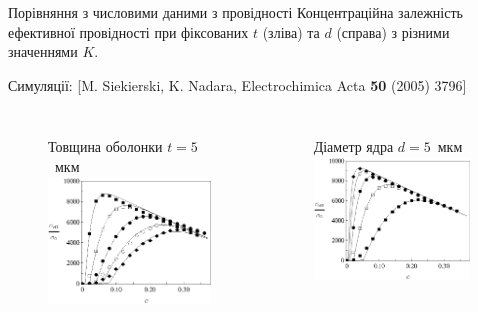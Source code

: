 \documentclass[10pt]{beamer}
\begin{document}
\begin{frame}{Порівняння з числовими даними з провідності}
Концентраційна залежність ефективної провідності при фіксованих $t$ (зліва) та $d$ (справа) з різними значеннями $K$.
\vspace{-5pt}

\scriptsize{Симуляції: [M. Siekierski, K. Nadara, Electrochimica Acta {\bf 50} (2005) 3796]}

\footnotesize
\begin{columns}[T,onlytextwidth]
      \begin{figure}
        \centering
        { \qquad Товщина оболонки $t=5$~мкм}
        \includegraphics[width=0.99\textwidth]{images/Fig6_Siekierski_HomogeneousLayers_t_fixed.eps}
      \end{figure}

      \begin{figure}
        \centering
        { \qquad Діаметр ядра $d=5$~мкм}
        \includegraphics[width=0.99\textwidth]{images/Fig7_Siekierski_HomogeneousLayers_d_fixed.eps}
      \end{figure}
\end{columns}


\end{frame}
\end{document}
